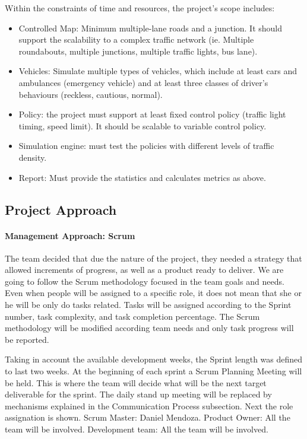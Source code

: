 \documentclass[11pt]{article}
\begin{document}
Within the constraints of time and resources, the project’s scope includes:
\begin{itemize}
\item Controlled Map: Minimum multiple-lane roads and a junction. It should support the scalability to a complex traffic network (ie. Multiple roundabouts, multiple junctions, multiple traffic lights, bus lane).
\item Vehicles: Simulate multiple types of vehicles, which include at least cars and ambulances (emergency vehicle) and at least three classes of driver’s behaviours (reckless, cautious, normal).
\item Policy: the project must support at least fixed control policy (traffic light timing, speed limit). It should be scalable to variable control policy.
\item Simulation engine: must test the policies with different levels of traffic density.
\item Report: Must provide the statistics and calculates metrics as above.
\end{itemize}


\subsection{Project Approach}
	\paragraph{Management Approach: Scrum} The team decided that due the nature of the project, they needed a strategy that allowed increments of progress, as well as a product ready to deliver. We are going to follow the Scrum methodology focused in the team goals and needs. Even when people will be assigned to a specific role, it does not mean that she or he will be only do tasks related. Tasks will be assigned according to the Sprint number, task complexity, and task completion percentage. The Scrum methodology will be modified according team needs and only task progress will be reported.
	
	Taking in account the available development weeks, the Sprint length was defined to last two weeks. At the beginning of each sprint a Scrum Planning Meeting will be held. This is where the team will decide what will be the next target deliverable for the sprint. The daily stand up meeting will be replaced by mechanisms explained in the Communication Process subsection.
	Next the role assignation is shown. Scrum Master: Daniel Mendoza. Product Owner: All the team will be involved. Development team: All the team will be involved.
	
\end{document}
